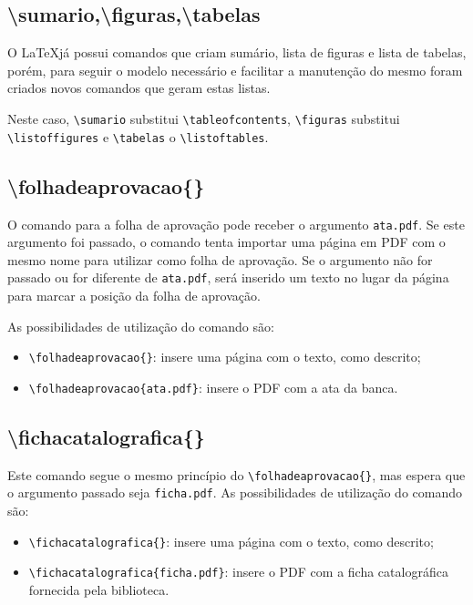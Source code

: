     \subsection{\textbackslash sumario,\textbackslash figuras,\textbackslash tabelas}
    O \LaTeX já possui comandos que criam sumário, lista de figuras e lista de tabelas, porém, para seguir o modelo necessário e facilitar a manutenção do mesmo foram criados novos comandos que geram estas listas.

    Neste caso, \verb+\sumario+ substitui \verb+\tableofcontents+, \verb+\figuras+ substitui \verb+\listoffigures+ e \verb+\tabelas+ o \verb+\listoftables+.

    \subsection{\textbackslash folhadeaprovacao\{\}}
    O comando para a folha de aprovação pode receber o argumento \texttt{ata.pdf}. Se este argumento foi passado, o comando tenta importar uma página em PDF com o mesmo nome para utilizar como folha de aprovação. Se o argumento não for passado ou for diferente de \texttt{ata.pdf}, será inserido um texto no lugar da página para marcar a posição da folha de aprovação.

    As possibilidades de utilização do comando são:
    \begin{itemize}
        \item \verb+\folhadeaprovacao{}+: insere uma página com o texto, como descrito;
        \item \verb+\folhadeaprovacao{ata.pdf}+: insere o PDF com a ata da banca.
    \end{itemize}
    
    
    \subsection{\textbackslash fichacatalografica\{\}}
    Este comando segue o mesmo princípio do \verb+\folhadeaprovacao{}+, mas espera que o argumento passado seja \texttt{ficha.pdf}. As possibilidades de utilização do comando são:
    \begin{itemize}
        \item \verb+\fichacatalografica{}+: insere uma página com o texto, como descrito;
        \item \verb+\fichacatalografica{ficha.pdf}+: insere o PDF com a ficha catalográfica fornecida pela biblioteca.
    \end{itemize}
 
